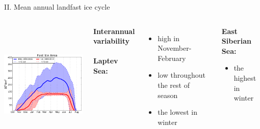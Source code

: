 \documentclass[8pt]{beamer}
\begin{document}
\setwatermark{\fontsize{125pt}{125pt}\selectfont{}}
\begin{frame}[fragile]{II. Mean annual landfast ice cycle}
	\begin{columns}
			\includegraphics[height=6cm]{./img/Mean_SeasonalCycle_ESSvsSELS.pdf}\\
			\begin{center}
				\textbf{Interannual variability}\\~\\
				\textbf{Laptev Sea:}
			\end{center}
				\begin{itemize}
					\item high in November-February
					\item low throughout the rest of season
					\item the lowest in winter
			\end{itemize}
			
			\begin{center}
				\textbf{East Siberian Sea:}
				\begin{itemize}
					\item the highest  in winter
				\end{itemize}
			\end{center}
	\end{columns}
	
\end{frame}
\end{document}
